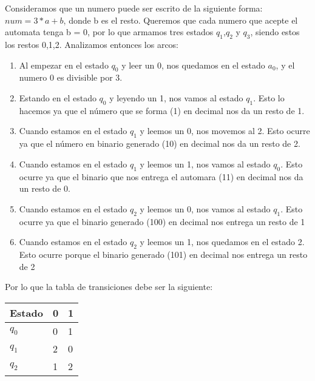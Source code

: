 \documentclass[spanish, fleqn]{article}
\begin{document}
\begin{enumerate}
Consideramos que un numero puede ser escrito de la siguiente forma: $num = 3*a + b$, donde b es el resto. Queremos que cada numero que acepte el automata tenga b = 0, por lo que armamos tres estados $q_1$,$q_2$ y $q_3$, siendo estos los restos 0,1,2. Analizamos entonces los arcos:

\begin{enumerate}

\item Al empezar en el estado $q_0$ y leer un 0, nos quedamos en el estado $a_0$, y el numero 0 es divisible por 3.

\item Estando en el estado $q_0$ y leyendo un 1, nos vamos al estado $q_1$. Esto lo hacemos ya que el número que se forma (1) en decimal nos da un resto de 1.

\item Cuando estamos en el estado $q_1$ y leemos un 0, nos movemos al 2. Esto ocurre ya que el número en binario generado (10) en decimal nos da un resto de 2.

\item Cuando estamos en el estado $q_1$ y leemos un 1, nos vamos al estado $q_0$. Esto ocurre ya que el binario que nos entrega el automara (11) en decimal nos da un resto de 0.

\item Cuando estamos en el estado $q_2$ y leemos un 0, nos vamos al estado $q_1$. Esto ocurre ya que el binario generado (100) en decimal nos entrega un resto de 1

\item Cuando estamos en el estado $q_2$ y leemos un 1, nos quedamos en el estado 2. Esto ocurre porque el binario generado (101) en decimal nos entrega un resto de 2

\end{enumerate}

Por lo que la tabla de transiciones debe ser la siguiente:

\begin{center}

\begin{tabular}{ | m{2cm} | m{1cm} | m{1cm} | } 
\hline
Estado & 0 & 1 \\
\hline
$q_0$ & 0 & 1\\
\hline
$q_1$ & 2 & 0 \\ 
\hline
$q_2$  & 1 & 2 \\ 
\hline
\end{tabular}
\end{center}


\end{enumerate}
\end{document}

